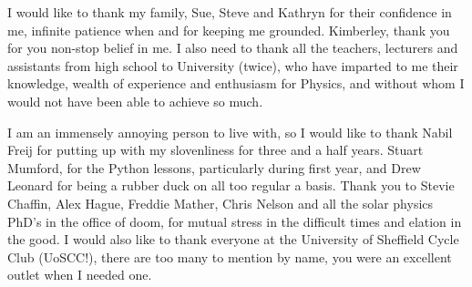 
\begin{acknowledgements}      

I would like to thank my family, Sue, Steve and Kathryn for their confidence in me, infinite patience when and for keeping me grounded.
Kimberley, thank you for you non-stop belief in me.
I also need to thank all the teachers, lecturers and assistants from high school to University (twice), who have imparted to me their knowledge, wealth of experience and enthusiasm for Physics, and without whom I would not have been able to achieve so much.

I am an immensely annoying person to live with, so I would like to thank Nabil Freij for putting up with my slovenliness for three and a half years.
Stuart Mumford, for the Python lessons, particularly during first year, and Drew Leonard for being a rubber duck on all too regular a basis.
Thank you to Stevie Chaffin, Alex Hague, Freddie Mather, Chris Nelson and all the solar physics PhD's in the office of doom, for mutual stress in the difficult times and elation in the good. 
I would also like to thank everyone at the University of Sheffield Cycle Club (UoSCC!), there are too many to mention by name, you were an excellent outlet when I needed one.




\end{acknowledgements}
